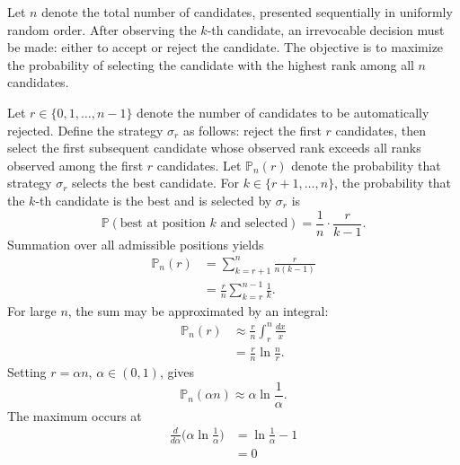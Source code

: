 \begin{example}
	Let $n$ denote the total number of candidates, presented sequentially in uniformly random order. After observing the $k$-th candidate, an irrevocable decision must be made: either to accept or reject the candidate. The objective is to maximize the probability of selecting the candidate with the highest rank among all $n$ candidates.\newline
	
	Let $r \in \{0,1,\dots,n-1\}$ denote the number of candidates to be automatically rejected. Define the strategy $\sigma_r$ as follows: reject the first $r$ candidates, then select the first subsequent candidate whose observed rank exceeds all ranks observed among the first $r$ candidates. Let $\mathbb{P}_n(r)$ denote the probability that strategy $\sigma_r$ selects the best candidate. For $k \in \{r+1,\dots,n\}$, the probability that the $k$-th candidate is the best and is selected by $\sigma_r$ is
	\begin{equation}
		\mathbb{P}(\text{best at position } k \text{ and selected}) = \frac{1}{n} \cdot \frac{r}{k-1}.
	\end{equation}
	Summation over all admissible positions yields
	\begin{equation}
		\begin{split}
			\mathbb{P}_n(r) &= \sum_{k=r+1}^{n} \frac{r}{n(k-1)}\\
			& = \frac{r}{n} \sum_{k=r}^{n-1} \frac{1}{k}.
		\end{split}
	\end{equation}  
	For large $n$, the sum may be approximated by an integral:
	\begin{equation}
		\begin{split}
			\mathbb{P}_n(r) &\approx \frac{r}{n} \int_{r}^{n} \frac{dx}{x}\\
			& = \frac{r}{n} \ln\frac{n}{r}.
		\end{split}
	\end{equation}
	Setting $r = \alpha n$, $\alpha \in (0,1)$, gives
	\begin{equation}
		\mathbb{P}_n(\alpha n) \approx \alpha \ln \frac{1}{\alpha}.
	\end{equation}
	The maximum occurs at
	\begin{equation}
		\begin{split}
			\frac{d}{d\alpha} \big(\alpha \ln \tfrac{1}{\alpha}\big) &= \ln \frac{1}{\alpha} - 1\\
			& = 0
		\end{split}

\end{equation}
\end{example}
